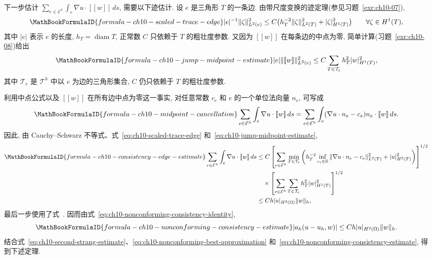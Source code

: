 下一步估计 $\sum_{e\in\mathcal E^h}\int_e\nabla u\cdot[\![w]\!]\,ds$, 需要以下迹估计. 设 $e$ 是三角形 $T$ 的一条边. 由带尺度变换的迹定理(参见习题~\ref{exr:ch10-07}),
\begin{equation}
\MathBookFormulaID{formula-ch10-scaled-trace-edge}
\label{eq:ch10-scaled-trace-edge}
|e|^{-1}\|\zeta\|_{L^2(e)}^2
\leq C\bigl(h_T^{-2}\|\zeta\|_{L^2(T)}^2+|\zeta|_{H^1(T)}^2\bigr)
\qquad\forall\zeta\in H^1(T),
\end{equation}
其中 $|e|$ 表示 $e$ 的长度, $h_T=\operatorname{diam}T$, 正常数 $C$ 只依赖于 $T$ 的粗壮度参数. 又因为 $[\![w]\!]$ 在每条边的中点为零, 简单计算(习题~\ref{exr:ch10-08})给出
\begin{equation}
\MathBookFormulaID{formula-ch10-jump-midpoint-estimate}
\label{eq:ch10-jump-midpoint-estimate}
|e|\|[\![w]\!]\|_{L^2(e)}^2
\leq C\sum_{T\in\mathcal T_e}h_T^2|w|_{H^1(T)}^2,
\end{equation}
其中 $\mathcal T_e$ 是 $\mathcal T^h$ 中以 $e$ 为边的三角形集合, $C$ 仍只依赖于 $T$ 的粗壮度参数.

利用中点公式以及 $[\![w]\!]$ 在所有边中点为零这一事实, 对任意常数 $c_e$ 和 $e$ 的一个单位法向量 $n_e$, 可写成
\[
\MathBookFormulaID{formula-ch10-midpoint-cancellation}
\sum_{e\in\mathcal E^h}\int_e\nabla u\cdot[\![w]\!]\,ds
=\sum_{e\in\mathcal E^h}\int_e(\nabla u\cdot n_e-c_e)n_e\cdot[\![w]\!]\,ds.
\]
因此, 由 Cauchy--Schwarz 不等式、式~\eqref{eq:ch10-scaled-trace-edge} 和~\eqref{eq:ch10-jump-midpoint-estimate},
\begin{align*}
\MathBookFormulaID{formula-ch10-consistency-edge-estimate}
\sum_{e\in\mathcal E^h}\int_e\nabla u\cdot[\![w]\!]\,ds
&\leq C\left[\sum_{e\in\mathcal E^h}\min_{T\in\mathcal T_e}
\left(h_T^{-2}\inf_{c_e\in\mathbb R}
\|\nabla u\cdot n_e-c_e\|_{L^2(T)}^2+|u|_{H^2(T)}^2\right)\right]^{1/2}\\
&\quad\times\left[\sum_{e\in\mathcal E^h}\sum_{T\in\mathcal T_e}
h_T^2|w|_{H^1(T)}^2\right]^{1/2}\\
&\leq Ch|u|_{H^2(\Omega)}\|w\|_h,
\end{align*}
最后一步使用了式~. 因而由式~\eqref{eq:ch10-nonconforming-consistency-identity},
\begin{equation}
\MathBookFormulaID{formula-ch10-nonconforming-consistency-estimate}
\label{eq:ch10-nonconforming-consistency-estimate}
|a_h(u-u_h,w)|\leq Ch|u|_{H^2(\Omega)}\|w\|_h.
\end{equation}
结合式~\eqref{eq:ch10-second-strang-estimate}、\eqref{eq:ch10-nonconforming-best-approximation} 和~\eqref{eq:ch10-nonconforming-consistency-estimate}, 得到下述定理.

